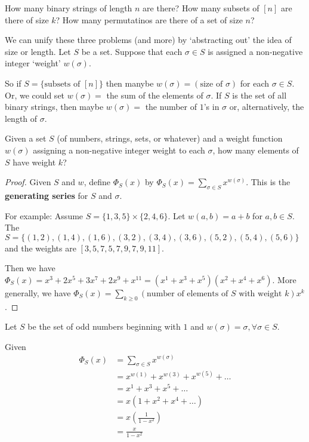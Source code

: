 \documentclass[12pt]{article}
\begin{document}
How many binary strings of length $n$ are there? How many subsets of $[n]$ are there of size $k$? How many permutatinos are there of a set of size $n$?

We can unify these three problems (and more) by `abstracting out' the idea of size or length. Let $S$ be a set. Suppose that each $\sigma \in S$ is assigned a non-negative integer `weight' $w(\sigma)$.

So if $S = \{\text{subsets of } [n]\}$ then manybe $w(\sigma) = (\text{size of }\sigma)$ for each $\sigma \in S$. Or, we could set $w(\sigma) =$ the sum of the elements of $\sigma$. If $S$ is the set of all binary strings, then maybe $w(\sigma) =$ the number of $1$'s in $\sigma$ or, alternatively, the length of $\sigma$.

\begin{example}
Given a set $S$ (of numbers, strings, sets, or whatever) and a weight function $w(\sigma)$ assigning a non-negative integer weight to each $\sigma$, how many elements of $S$ have weight $k$?
\end{example}

\begin{proof}
Given $S$ and $w$, define $\Phi_S(x)$ by $\Phi_S(x) = \displaystyle\sum_{\sigma \in S} x^{w(\sigma)}$. This is the {\bf generating series} for $S$ and $\sigma$.

For example: Assume $S = \{1, 3, 5\} \times \{2, 4, 6\}$. Let $w(a,b) = a+b$ for $a,b \in S$. The $S = \{ (1,2), (1,4), (1,6), (3,2), (3,4), (3,6), (5,2), (5,4), (5,6) \}$ and the weights are $[ 3, 5, 7, 5, 7, 9, 7, 9, 11 ]$.

Then we have $\Phi_S(x) = x^3 + 2x^5 + 3x^7 + 2x^9 + x^{11} = (x^1 + x^3 + x^5)(x^2 + x^4 + x^6)$. More generally, we have $\Phi_S(x) = \displaystyle\sum_{k \geq 0} (\text{number of elements of }S\text{ with weight }k)x^k$.
\end{proof}

\begin{example}
Let $S$ be the set of odd numbers beginning with $1$ and $w(\sigma) = \sigma, \forall \sigma \in S$.

Given
\begin{align*}
\Phi_S(x) &= \sum_{\sigma \in S} x^{w(\sigma)}\\
&= x^{w(1)} + x^{w(3)} + x^{w(5)} + \dots\\
&= x^1 + x^3 + x^5 + \dots\\
&= x(1 + x^2 + x^4 + \dots)\\
&= x(\frac{1}{1 - x^2})\\
&= \frac{x}{1-x^2}
\end{align*}
\end{example}
\end{document}
